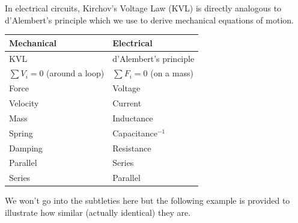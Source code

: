 In electrical circuits, Kirchov's Voltage Law (KVL) is
directly analogous to d'Alembert's principle which we use
to derive mechanical equations of motion.


\vspace{0.25in}
\begin{center}
\begin{tabular}{l|l}
Mechanical & Electrical \\\hline
KVL  & d'Alembert's principle \\
$\sum V_i =0$ (around a loop)  & $\sum F_i = 0$ (on a mass) \\
Force & Voltage \\
Velocity & Current \\
Mass   & Inductance \\
Spring  & Capacitance$^{-1}$ \\
Damping & Resistance \\
Parallel & Series \\
Series   & Parallel \\
\end{tabular}
\end{center}
\vspace{0.25in}

We won't go into the subtleties here but the following example is provided to illustrate how similar (actually identical) they are.

